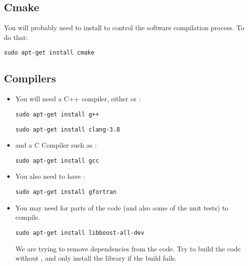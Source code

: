\documentclass[11pt,fleqn]{book} %
\begin{document}
\subsection{Cmake}
You will probably need to install  to control the software compilation process. To do that:
\begin{lstlisting}[backgroundcolor=\color{background}]
     sudo apt-get install cmake
\end{lstlisting}

\subsection{Compilers}
\begin{itemize}
  \item You will need a C++ compiler, either  or :
\begin{lstlisting}[backgroundcolor=\color{background}]
sudo apt-get install g++
\end{lstlisting}
\begin{lstlisting}[backgroundcolor=\color{background}]
sudo apt-get install clang-3.8
\end{lstlisting}

  \item and a C Compiler such as :
\begin{lstlisting}[backgroundcolor=\color{background}]
sudo apt-get install gcc
\end{lstlisting}

  \item You also need to have :
\begin{lstlisting}[backgroundcolor=\color{background}]
sudo apt-get install gfortran
\end{lstlisting}

  \item You may need  for parts of the code (and also some of the unit tests) to compile.
\begin{lstlisting}[backgroundcolor=\color{background}]
sudo apt-get install libboost-all-dev
\end{lstlisting}
        \begin{NoteBox}
        We are trying to remove  dependencies from the code.  Try to build the code
        without , and only install the library if the build fails.
        \end{NoteBox}
\end{itemize}
\end{document}
